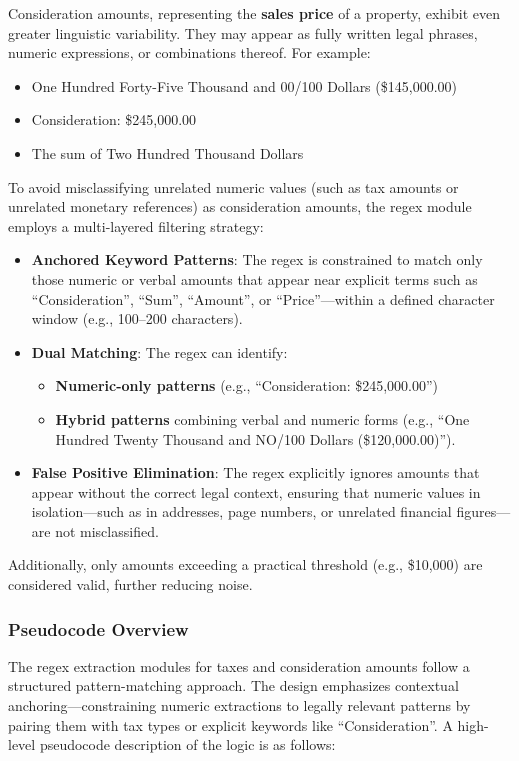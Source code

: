 \documentclass{article}
\begin{document}
Consideration amounts, representing the \textbf{sales price} of a property, exhibit even greater linguistic variability. They may appear as fully written legal phrases, numeric expressions, or combinations thereof. For example:
\begin{itemize}
    \item One Hundred Forty-Five Thousand and 00/100 Dollars (\$145,000.00)
    \item Consideration: \$245,000.00
    \item The sum of Two Hundred Thousand Dollars
\end{itemize}

To avoid misclassifying unrelated numeric values (such as tax amounts or unrelated monetary references) as consideration amounts, the regex module employs a multi-layered filtering strategy:
\begin{itemize}
    \item \textbf{Anchored Keyword Patterns}: The regex is constrained to match only those numeric or verbal amounts that appear near explicit terms such as ``Consideration'', ``Sum'', ``Amount'', or ``Price''---within a defined character window (e.g., 100--200 characters).
    \item \textbf{Dual Matching}: The regex can identify:\begin{itemize}
        \item \textbf{Numeric-only patterns} (e.g., ``Consideration: \$245,000.00'')
        \item \textbf{Hybrid patterns} combining verbal and numeric forms (e.g., ``One Hundred Twenty Thousand and NO/100 Dollars (\$120,000.00)'').
    \end{itemize}
    \item \textbf{False Positive Elimination}: The regex explicitly ignores amounts that appear without the correct legal context, ensuring that numeric values in isolation---such as in addresses, page numbers, or unrelated financial figures---are not misclassified.
\end{itemize}

Additionally, only amounts exceeding a practical threshold (e.g., \$10,000) are considered valid, further reducing noise.


\subsubsection{Pseudocode Overview}

The regex extraction modules for taxes and consideration amounts follow a structured pattern-matching approach. The design emphasizes contextual anchoring---constraining numeric extractions to legally relevant patterns by pairing them with tax types or explicit keywords like ``Consideration''. A high-level pseudocode description of the logic is as follows:
\end{document}
